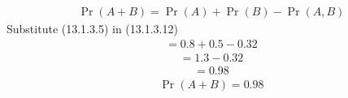 \documentclass{article}
\begin{document}
\begin{enumerate}[label=13.\arabic{enumi}.\arabic{enumii}]
 \begin{align}
 \Pr{(A+B)}= \Pr{(A)}+\Pr{(B)}-\Pr{(A, B)}
 \end{align}
 Substitute (13.1.3.5) in (13.1.3.12)
 \begin{align}
 =0.8+0.5-0.32
 \end{align}
 \begin{align}
 =1.3-0.32
 \end{align}
 \begin{align}
 = 0.98
 \end{align}
 \begin{align}
\boxed{ \Pr{(A+B)}=0.98}
 \end{align}
    
\end{enumerate}
\end{document}
